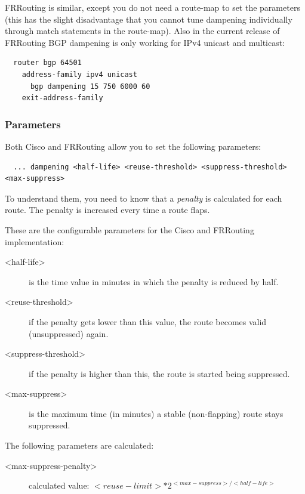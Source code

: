 FRRouting is similar, except you do not need a route-map to set the parameters (this has the slight disadvantage that you cannot tune dampening individually through match statements in the route-map). Also in the current release of FRRouting BGP dampening is only working for IPv4 unicast and multicast:
\begin{verbatim}
  router bgp 64501
    address-family ipv4 unicast
      bgp dampening 15 750 6000 60
    exit-address-family
\end{verbatim}

\subsubsection{Parameters}
Both Cisco and FRRouting allow you to set the following parameters:
\begin{verbatim}
  ... dampening <half-life> <reuse-threshold> <suppress-threshold> <max-suppress>
\end{verbatim}

To understand them, you need to know that a \emph{penalty} is calculated for each route. The penalty is increased every time a route flaps.

These are the configurable parameters for the Cisco and FRRouting implementation:
\begin{description}
  \item[<half-life>] is the time value in minutes in which the penalty is reduced by half.
  \item[<reuse-threshold>] if the penalty gets lower than this value, the route becomes valid (unsuppressed) again.
  \item[<suppress-threshold>] if the penalty is higher than this, the route is started being suppressed.
  \item[<max-suppress>] is the maximum time (in minutes) a stable (non-flapping) route stays suppressed.
\end{description}

The following parameters are calculated:
\begin{description}
  \item[<max-suppress-penalty>] calculated value:
   \( <reuse-limit> * 2^{<max-suppress> / <half-life>}  \)
\end{description}

